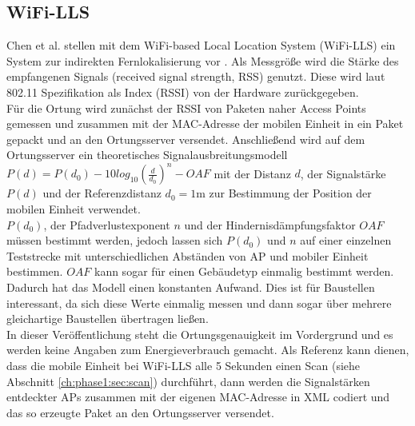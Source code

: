 \subsection{WiFi-LLS}
\label{ch:Vorherige:sec:LLS}
Chen et al. stellen mit dem WiFi-based Local Location System (WiFi-LLS) ein System zur indirekten Fernlokalisierung vor \cite{chen2007design}.
Als Messgröße wird die Stärke des empfangenen Signals (received signal strength, RSS) genutzt. 
Diese wird laut 802.11 Spezifikation als Index (RSSI) von der Hardware zurückgegeben. \\
Für die Ortung wird zunächst der RSSI von Paketen naher Access Points gemessen und zusammen mit der MAC-Adresse der mobilen Einheit in ein Paket gepackt und an den Ortungsserver versendet.
Anschließend wird auf dem Ortungsserver ein theoretisches Signalausbreitungsmodell $P(d) = P(d_0) - 10log_{10}(\frac{d}{d_0})^n - OAF$ mit der Distanz $d$, der Signalstärke $P(d)$ und der Referenzdistanz $d_0 = 1$m zur Bestimmung der Position der mobilen Einheit verwendet. \\
$P(d_0)$, der Pfadverlustexponent $n$ und der Hindernisdämpfungsfaktor $OAF$ müssen bestimmt werden, jedoch lassen sich $P(d_0)$ und $n$ auf einer einzelnen Teststrecke mit unterschiedlichen Abständen von AP und mobiler Einheit bestimmen. $OAF$ kann sogar für einen Gebäudetyp einmalig bestimmt werden.
Dadurch hat das Modell einen konstanten Aufwand. 
Dies ist für Baustellen interessant, da sich diese Werte einmalig messen und dann sogar über mehrere gleichartige Baustellen übertragen ließen.\\
In dieser Veröffentlichung steht die Ortungsgenauigkeit im Vordergrund und es werden keine Angaben zum Energieverbrauch gemacht. 
Als Referenz kann dienen, dass die mobile Einheit bei WiFi-LLS alle 5 Sekunden einen Scan (siehe Abschnitt \ref{ch:phase1:sec:scan}) durchführt, dann werden die Signalstärken entdeckter APs zusammen mit der eigenen MAC-Adresse in XML codiert und das so erzeugte Paket an den Ortungsserver versendet.

